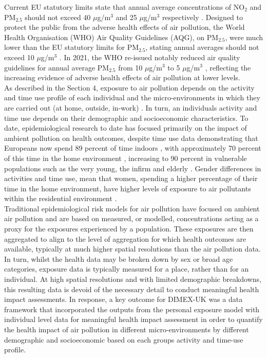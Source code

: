\documentclass{article}
\begin{document}
\noindent Current EU statutory limits state that annual average concentrations of NO$_{2}$ and PM$_{2.5}$ should not exceed 40 $\mu$g/m$^{3}$ and 25 $\mu$g/m$^{3}$ respectively \citep{EEAAQGs}. Designed to protect the public from the adverse health effects of air pollution, the World Health Organisation (WHO) Air Quality Guidelines (AQG),  on PM$_{2.5}$, were much lower than the EU statutory limits for PM$_{2.5}$, stating annual averages should not exceed 10 $\mu$g/m$^{3}$ \citep{world2006air}. In 2021, the WHO re-issued notably reduced air quality guidelines for annual average PM$_{2.5}$ from 10 $\mu$g/m$^{3}$ to 5 $\mu$g/m$^{3}$ \citep{weltgesundheitsorganisation2021global}, reflecting the increasing evidence of adverse health effects of air pollution at lower levels.\\

\noindent As described in the Section 4, exposure to air pollution depends on the activity and time use profile of each individual and the micro-environments in which they are carried out (at home, outside, in-work) \citep{borghi2021estimation}. In turn, an individuals activity and time use depends on their demographic and socioeconomic characteristics. To date, epidemiological research to date has focused primarily on the impact of ambient pollution on health outcomes, despite time use data demonstrating that Europeans now spend 89 percent of time indoors \citep{mcgrath2017pm}, with approximately 70 percent of this time in the home environment \citep{klepeis2001national, schweizer2007indoor}, increasing to 90 percent in vulnerable populations such as the very young, the infirm and elderly \citep{spalt2016time, Torfs2008}. Gender differences in activities and time use, mean that women, spending a higher percentage of their time in the home environment, have higher levels of exposure to air pollutants within the residential environment \citep{borghi2021estimation}. \\    

\noindent Traditional epidemiological risk models for air pollution have focused on ambient air pollution and are based on measured, or modelled, concentrations acting as a proxy for the exposures experienced by a population. These exposures are then aggregated to align to the level of aggregation for which health outcomes are available, typically at much higher spatial resolutions than the air pollution data. In turn, whilst the health data may be broken down by sex or broad age categories, exposure data is typically measured for a place, rather than for an individual. At high spatial resolutions and with limited demographic breakdowns, this resulting data is devoid of the necessary detail to conduct meaningful health impact assessments. In response, a key outcome for DIMEX-UK was a data framework that incorporated the outputs from the personal exposure model with individual level data for meaningful health impact assessment in order to quantify the health impact of air pollution in different micro-environments by different demographic and socioeconomic based on each groups activity and time-use profile. \\
\end{document}
